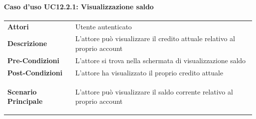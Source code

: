 \paragraph{Caso d'uso UC12.2.1: Visualizzazione saldo}
\label{UC12_2_1}
\begin{minipage}{\linewidth}
	\begin{tabular}{ l | p{11cm}}
		\hline
		\rowcolor{Gray}
		\multicolumn{2}{c}{UC12.2.1 - Visualizzazione saldo} \\
		\hline
		\textbf{Attori} & Utente autenticato \\
		\textbf{Descrizione} & L'attore può visualizzare il credito attuale relativo al proprio account \\
		\textbf{Pre-Condizioni} & L'attore si trova nella schermata di visualizzazione saldo\\
		\textbf{Post-Condizioni} & L'attore ha visualizzato il proprio credito attuale \\
		\textbf{Scenario Principale} & 
		\begin{enumerate*}[label=(\arabic*.),itemjoin={\newline}]
			\item L'attore può visualizzare il saldo corrente relativo al proprio account
		\end{enumerate*}\\
	\end{tabular}
\end{minipage}

